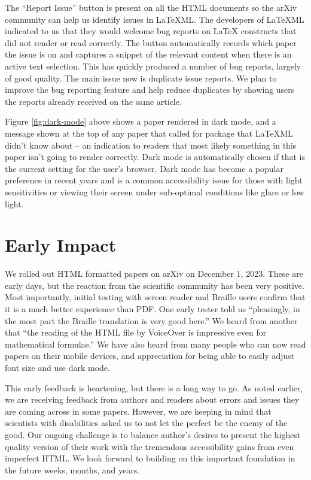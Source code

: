 \documentclass{easychair}
\begin{document}
The ``Report Issue'' button is present on all the HTML documents so the arXiv community can help us identify issues in LaTeXML. The developers of LaTeXML indicated to us that they would welcome bug reports on LaTeX constructs that did not render or read correctly. The button automatically records which paper the issue is on and captures a snippet of the relevant content when there is an active text selection. This has quickly produced a number of bug reports, largely of good quality. The main issue now is duplicate issue reports. We plan to improve the bug reporting feature and help reduce duplicates by showing users the reports already received on the same article.

Figure \ref{fig:dark-mode} above shows a paper rendered in dark mode, and a message shown at the top of any paper that called for package that LaTeXML didn't know about -- an indication to readers that most likely something in this paper isn't going to render correctly. Dark mode is automatically chosen if that is the current setting for the user's browser. Dark mode has become a popular preference in recent years and is a common accessibility issue for those with light sensitivities or viewing their screen under sub-optimal conditions like glare or low light.

\section{Early Impact}
\label{sect:Early Layout}

We rolled out HTML formatted papers on arXiv on December 1, 2023. These are early days, but the reaction from the scientific community has been very positive. Most importantly, initial testing with screen reader and Braille users confirm that it is a much better experience than PDF. One early tester told us ``pleasingly, in the most part the Braille translation is very good here.'' We heard from another that ``the reading of the HTML file by VoiceOver is impressive even for mathematical formulae.'' We have also heard from many people who can now read papers on their mobile devices, and appreciation for being able to easily adjust font size and use dark mode. 

This early feedback is heartening, but there is a long way to go. As noted earlier, we are receiving feedback from authors and readers about errors and issues they are coming across in some papers. However, we are keeping in mind that scientists with disabilities asked us to not let the perfect be the enemy of the good. Our ongoing challenge is to balance author's desires to present the highest quality version of their work with the tremendous accessibility gains from even imperfect HTML. We look forward to building on this important foundation in the future weeks, months, and years. 
\end{document}
